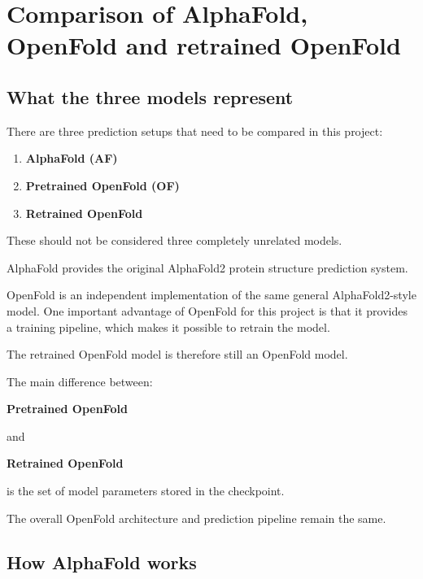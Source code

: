 \documentclass[11pt,a4paper]{article}
\begin{document}
\section{Comparison of AlphaFold, OpenFold and retrained OpenFold}

\subsection{What the three models represent}

There are three prediction setups that need to be compared in this project:

\begin{enumerate}[leftmargin=*]

    \item \textbf{AlphaFold (AF)}

    \item \textbf{Pretrained OpenFold (OF)}

    \item \textbf{Retrained OpenFold}

\end{enumerate}

These should not be considered three completely unrelated models.

AlphaFold provides the original AlphaFold2 protein structure prediction system.

OpenFold is an independent implementation of the same general AlphaFold2-style model. One important advantage of OpenFold for this project is that it provides a training pipeline, which makes it possible to retrain the model.

The retrained OpenFold model is therefore still an OpenFold model.

The main difference between:

\begin{center}
\textbf{Pretrained OpenFold}
\end{center}

and

\begin{center}
\textbf{Retrained OpenFold}
\end{center}

is the set of model parameters stored in the checkpoint.

The overall OpenFold architecture and prediction pipeline remain the same.


\subsection{How AlphaFold works}
\end{document}
